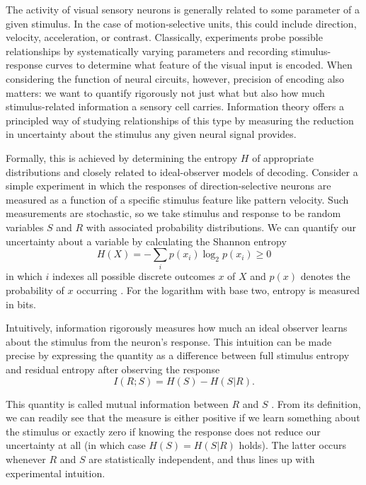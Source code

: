The activity of visual sensory neurons is generally related to some parameter of a given stimulus. In the case of motion-selective units, this could include direction, velocity, acceleration, or contrast. Classically, experiments probe possible relationships by systematically varying parameters and recording stimulus-response curves to determine what feature of the visual input is encoded. When considering the function of neural circuits, however, precision of encoding also matters: we want to quantify rigorously not just what but also how much stimulus-related information a sensory cell carries. Information theory offers a principled way of studying relationships of this type by measuring the reduction in uncertainty about the stimulus any given neural signal provides.

Formally, this is achieved by determining the entropy $H$ of appropriate distributions and closely related to ideal-observer models of decoding. Consider a simple experiment in which the responses of direction-selective neurons are measured as a function of a specific stimulus feature like pattern velocity. Such measurements are stochastic, so we take stimulus and response to be random variables $S$ and $R$ with associated probability distributions. We can quantify our uncertainty about a variable by calculating the Shannon entropy
\begin{equation}
    H(X) = - \sum_{i} p(x_i) \log_2 p(x_i) \geq 0
\end{equation}
in which $i$ indexes all possible discrete outcomes $x$ of $X$ and $p(x)$ denotes the probability of $x$ occurring \citep{Cover:2006aa}. For the logarithm with base two, entropy is measured in bits.

Intuitively, information rigorously measures how much an ideal observer learns about the stimulus from the neuron's response. This intuition can be made precise by expressing the quantity as a difference between full stimulus entropy and residual entropy after observing the response
\begin{equation}
    I(R; S) = H(S) - H(S|R).
\end{equation}

This quantity is called mutual information between $R$ and $S$ \citep{Cover:2006aa}. From its definition, we can readily see that the measure is either positive if we learn something about the stimulus or exactly zero if knowing the response does not reduce our uncertainty at all (in which case $H(S) = H(S|R)$ holds). The latter occurs whenever $R$ and $S$ are statistically independent, and thus lines up with experimental intuition.

